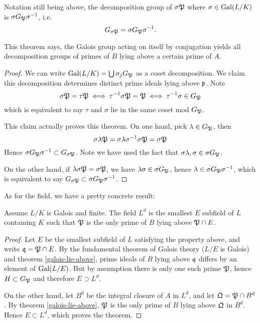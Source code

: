 		\begin{theorem}
			Notation still being above, the decomposition group of $\sigma\mathfrak{P}$ where $\sigma \in \operatorname{Gal}(L/K)$ is $\sigma G_\mathfrak{P}\sigma^{-1}$, i.e.
			\[
				G_{\sigma\mathfrak{P}} = \sigma G_\mathfrak{P}\sigma^{-1}.
			\]
		\end{theorem}
		This theorem says, the Galois group acting on itself by conjugation yields all decomposition groups of primes of $B$ lying above a certain prime of $A$.
		\begin{proof}
			We can write $\operatorname{Gal}(L/K) = \bigcup\sigma_jG_\mathfrak{P}$ as a coset decomposition. We claim this decomposition determines distinct prime ideals lying above $\mathfrak{p}$. Note
			\[
				\sigma\mathfrak{P}=\tau\mathfrak{P} \iff \tau^{-1}\sigma\mathfrak{P}=\mathfrak{P} \iff \tau^{-1}\sigma \in G_\mathfrak{P}
			\]
			which is equivalent to say $\tau$ and $\sigma$ lie in the same coset mod $G_\mathfrak{P}$. 
			
			This claim actually proves this theorem. On one hand, pick $\lambda \in G_\mathfrak{P}$, then
			\[
				\sigma\lambda\mathfrak{P} = \sigma\lambda\sigma^{-1}\sigma\mathfrak{P} = \sigma\mathfrak{P}
			\]
			Hence $\sigma G_{\mathfrak{P}}\sigma^{-1} \subset G_{\sigma\mathfrak{P}}$. Note we have used the fact that $\sigma\lambda,\sigma \in \sigma G_\mathfrak{P}$. 
			
			On the other hand, if $\lambda\sigma\mathfrak{P} = \sigma\mathfrak{P}$, we have $\lambda\sigma \in \sigma G_\mathfrak{P}$, hence $\lambda \in \sigma G_\mathfrak{P}\sigma^{-1}$, which is equivalent to say $G_{\sigma\mathfrak{P}} \subset \sigma G_\mathfrak{P} \sigma^{-1}$.
		\end{proof}
	
		As for the field, we have a pretty concrete result:
			
		\begin{theorem}
			Assume $L/K$ is Galois and finite. The field $L^d$ is the smallest $E$ subfield of $L$ containing $K$ such that $\mathfrak{P}$ is the only prime of $B$ lying above $\mathfrak{P} \cap E$. 
		\end{theorem}
		\begin{proof}
			Let $E$ be the smallest subfield of $L$ satisfying the property above, and write $\mathfrak{q} = \mathfrak{P} \cap E$. By the fundamental theorem of Galois theory ($L/E$ is Galois) and theorem \ref{galois-lie-above}, prime ideals of $B$ lying above $\mathfrak{q}$ differs by an element of $\operatorname{Gal}(L/E)$. But by assumption there is only one such prime $\mathfrak{P}$, hence $H \subset G_\mathfrak{P}$ and therefore $E \supset L^d$.
			
			On the other hand, let $B^d$ be the integral closure of $A$ in $L^d$, and let $\mathfrak{Q}=\mathfrak{P} \cap B^d$. By theorem \ref{galois-lie-above}, $\mathfrak{P}$ is the only prime of $B$ lying above $\mathfrak{Q}$ in $B^d$. Hence $E \subset L^d$, which proves the theorem.
		\end{proof}
		
